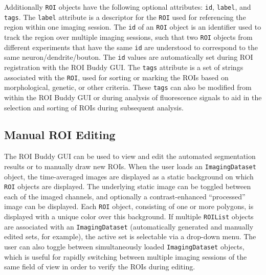 Additionally \verb|ROI| objects have the following
optional attributes: \verb|id|, \verb|label|, and \verb|tags|.
The \verb|label| attribute is a descriptor for the \verb|ROI| used for
referencing the region within one imaging session.
The \verb|id| of an \verb|ROI| object is an identifier used to track the region over
multiple imaging sessions, such that two \verb|ROI| objects from different experiments
that have the same \verb|id| are understood to correspond to the same neuron/dendrite/bouton.
The \verb|id| values are automatically set during ROI registration with the ROI Buddy GUI.
The \verb|tags| attribute is a set of strings associated with the \verb|ROI|, used for
sorting or marking the ROIs based on morphological, genetic, or other criteria.
These \verb|tags| can also be modified from within the ROI Buddy GUI or during analysis of fluorescence signals
to aid in the selection and sorting of ROIs during subsequent analysis.

\subsection{Manual ROI Editing}
\label{sec:sima:ROIbuddy}
The ROI Buddy GUI can be used to view and edit the automated segmentation results
or to manually draw new ROIs.
When the user loads an \verb|ImagingDataset| object, the time-averaged images are displayed as a static background on which \verb|ROI|
objects are displayed.
The underlying static image can be toggled between each of the imaged channels,
and optionally a contrast-enhanced ``processed'' image can be displayed.
Each \verb|ROI| object, consisting of one or more polygons, is displayed with a unique color over this background.
If multiple \verb|ROIList| objects are associated with an \verb|ImagingDataset| 
(automatically generated and manually edited sets, for example), 
the active set is selectable via a drop-down menu.
The user can also toggle between simultaneously loaded \verb|ImagingDataset| objects, 
which is useful for rapidly switching between multiple imaging sessions of the same field of view
in order to verify the ROIs during editing.


